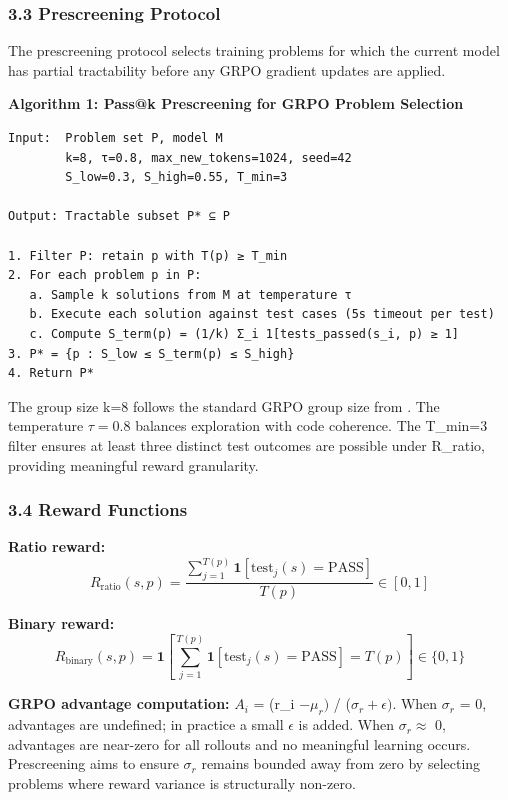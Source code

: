 \subsubsection{3.3 Prescreening Protocol}

The prescreening protocol selects training problems for which the current model has partial tractability before any GRPO gradient updates are applied.

\textbf{Algorithm 1: Pass@k Prescreening for GRPO Problem Selection}

\begin{verbatim}
Input:  Problem set P, model M
        k=8, τ=0.8, max_new_tokens=1024, seed=42
        S_low=0.3, S_high=0.55, T_min=3

Output: Tractable subset P* ⊆ P

1. Filter P: retain p with T(p) ≥ T_min
2. For each problem p in P:
   a. Sample k solutions from M at temperature τ
   b. Execute each solution against test cases (5s timeout per test)
   c. Compute S_term(p) = (1/k) Σ_i 1[tests_passed(s_i, p) ≥ 1]
3. P* = {p : S_low ≤ S_term(p) ≤ S_high}
4. Return P*
\end{verbatim}

The group size k=8 follows the standard GRPO group size from \citep{Shao2024}. The temperature $\tau =0.8$ balances exploration with code coherence. The T\_min=3 filter ensures at least three distinct test outcomes are possible under R\_ratio, providing meaningful reward granularity.

\subsubsection{3.4 Reward Functions}

\textbf{Ratio reward:}
$$R_{\text{ratio}}(s, p) = \frac{\sum_{j=1}^{T(p)} \mathbf{1}[\text{test}_j(s) = \text{PASS}]}{T(p)} \in [0, 1]$$

\textbf{Binary reward:}
$$R_{\text{binary}}(s, p) = \mathbf{1}\!\left[\sum_{j=1}^{T(p)} \mathbf{1}[\text{test}_j(s) = \text{PASS}] = T(p)\right] \in \{0, 1\}$$

\textbf{GRPO advantage computation:} $A_i$ = (r\_i $- \mu _{r})$ / ($\sigma _r + \epsilon )$. When $\sigma _r$ = 0, advantages are undefined; in practice a small $\epsilon$ is added. When $\sigma _r \approx$ 0, advantages are near-zero for all rollouts and no meaningful learning occurs. Prescreening aims to ensure $\sigma _r$ remains bounded away from zero by selecting problems where reward variance is structurally non-zero.

